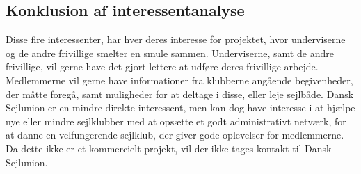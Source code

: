 \subsection{Konklusion af interessentanalyse}

Disse fire interessenter, har hver deres interesse for projektet, hvor underviserne og de andre frivillige smelter en smule sammen. 
Underviserne, samt de andre frivillige, vil gerne have det gjort lettere at udføre deres frivillige arbejde.
Medlemmerne vil gerne have informationer fra klubberne angående begivenheder, der måtte foregå, samt muligheder for at deltage i disse, eller leje sejlbåde.
Dansk Sejlunion er en mindre direkte interessent, men kan dog have interesse i at hjælpe nye eller mindre sejlklubber med at opsætte et godt administrativt netværk, for at danne en velfungerende sejlklub, der giver gode oplevelser for medlemmerne.
Da dette ikke er et kommercielt projekt, vil der ikke tages kontakt til Dansk Sejlunion. 
